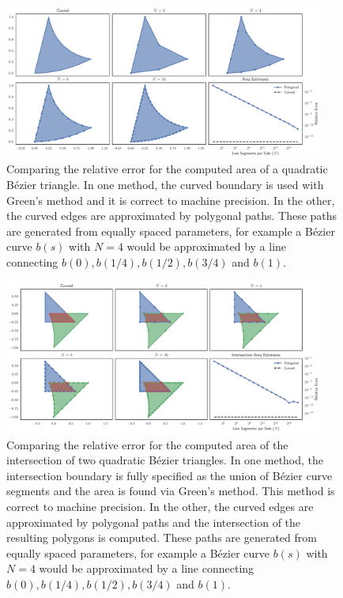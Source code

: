 \begin{figure}
  \includegraphics[width=0.9375\textwidth]
                  {../images/curved-mesh/polygon_vs_curved.pdf}
  \centering
  \caption{Comparing the relative error for the computed area of a quadratic
    B\'{e}zier triangle. In one method, the curved boundary is used with
    Green's method and it is correct to machine precision. In the other,
    the curved edges are approximated by polygonal paths. These paths are
    generated from equally spaced parameters, for example a B\'{e}zier curve
    \(b(s)\) with \(N = 4\) would be approximated by a line connecting
    \(b(0), b(1/4), b(1/2), b(3/4)\) and \(b(1)\).}
  \label{fig:polygon-vs-curved}
\end{figure}

\begin{figure}
  \includegraphics[width=0.9375\textwidth]
                  {../images/curved-mesh/polygon_vs_curved_intersection.pdf}
  \centering
  \caption{Comparing the relative error for the computed area of the
    intersection of two quadratic B\'{e}zier triangles. In one method, the
    intersection boundary is fully specified as the union of B\'{e}zier curve
    segments and the area is found via Green's method. This method is correct
    to machine precision. In the other, the curved edges are approximated by
    polygonal paths and the intersection of the resulting polygons is computed.
    These paths are generated from equally spaced parameters, for example a
    B\'{e}zier curve \(b(s)\) with \(N = 4\) would be approximated by a line
    connecting \(b(0), b(1/4), b(1/2), b(3/4)\) and \(b(1)\).}
  \label{fig:polygon-vs-curved-intersection}
\end{figure}

